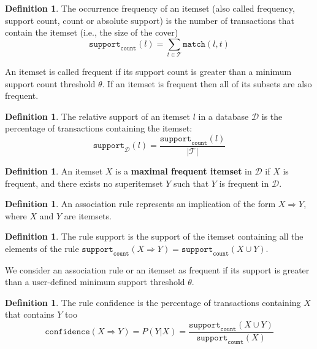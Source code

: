 \documentclass[12pt, openany]{report}
\theoremstyle{definition}
\newtheorem{definition}[thm]{Definition}
\begin{document}
\begin{definition}
    The occurrence frequency of an itemset (also called frequency, support count, count or absolute support) is the number of transactions that contain the itemset (i.e., the size of the cover)
    \begin{equation}
        \texttt{support}_\texttt{count}(l) = \sum_{t \in \mathcal{T}} \texttt{match}(l,t)
    \end{equation}
\end{definition}
An itemset is called frequent if its support count is greater than a minimum support count threshold $\theta$. If an itemset is frequent then all of its subsets are also frequent.
\begin{definition}
    The relative support of an itemset $l$ in a database $\mathcal{D}$ is the percentage of transactions containing the itemset:
    \begin{equation}
        \texttt{support}_{\mathcal{D}}(l) = \frac{\texttt{support}_\texttt{count}(l)}{|\mathcal{T}|}
    \end{equation}
\end{definition}
\begin{definition}
    An itemset $X$ is a \textbf{maximal frequent itemset} in $\mathcal{D}$ if $X$ is frequent, and there exists no superitemset $Y$ such that $Y$ is frequent in $\mathcal{D}$.
\end{definition}
\begin{definition}
    An association rule represents an implication of the form $X \Rightarrow Y$, where $X$ and $Y$ are itemsets.
\end{definition}
\begin{definition}
    The rule support is the support of the itemset containing all the elements of the rule $\texttt{support}_\texttt{count}(X \Rightarrow Y) = \texttt{support}_\texttt{count}(X \cup Y)$.
\end{definition}
We consider an association rule or an itemset as frequent if its support is greater than a user-defined minimum support threshold $\theta$.
\begin{definition}
    The rule confidence is the percentage of transactions containing $X$ that contains $Y$ too
    \begin{equation}
        \texttt{confidence}(X \Rightarrow Y) = P(Y|X) = \frac{\texttt{support}_\texttt{count}(X \cup Y)}{\texttt{support}_\texttt{count}(X)}
    \end{equation}
\end{definition}
\end{document}
